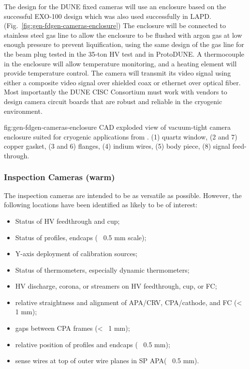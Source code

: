 The design for the DUNE fixed cameras will use an enclosure based on
the successful EXO-100 design\cite{Delaquis:2013hva} which was also
used successfully in
LAPD. (Fig.\ \ref{fig:gen-fdgen-cameras-enclosure}) The enclosure will
be connected to stainless steel gas line to allow the enclosure to be
flushed with argon gas at low enough pressure to prevent
liquification, using the same design of the gas line for the beam plug
tested in the 35-ton HV test and in ProtoDUNE.  A thermocouple in the
enclosure will allow temperature monitoring, and a heating element
will provide temperature control.  The camera will transmit its video
signal using either a composite video signal over shielded coax or
ethernet over optical fiber.  Most importantly the DUNE CISC
Consortium must work with vendors to design camera circuit boards that
are robust and reliable in the cryogenic environment.

\begin{dunefigure}{fig:gen-fdgen-cameras-enclosure}
  {CAD exploded view of vacuum-tight camera enclosure suited for cryogenic applications from \cite{Delaquis:2013hva}.
    (1) quartz window, (2 and 7) copper gasket, (3 and 6) flanges, (4) indium wires, (5) body piece, (8) signal feed-through.
  }
\end{dunefigure}



\subsubsection{Inspection Cameras (warm)}

The inspection cameras are intended to be as versatile as possible.
However, the following locations have been identified as likely
to be of interest:
\begin{itemize}
\item Status of HV feedthrough and cup;
\item Status of profiles, endcaps (~ 0.5 mm scale);
\item Y-axis deployment of calibration sources;
\item Status of thermometers, especially dynamic thermometers;
\item HV discharge, corona, or streamers on HV feedthrough, cup, or FC;
\item relative straightness and alignment of APA/CRV, CPA/cathode, and FC (<~ 1 mm);
\item gaps between CPA frames (<~ 1 mm);
\item relative position of profiles and endcaps (~ 0.5 mm);
\item sense wires at top of outer wire planes in SP APA(~ 0.5 mm).
\end{itemize}

